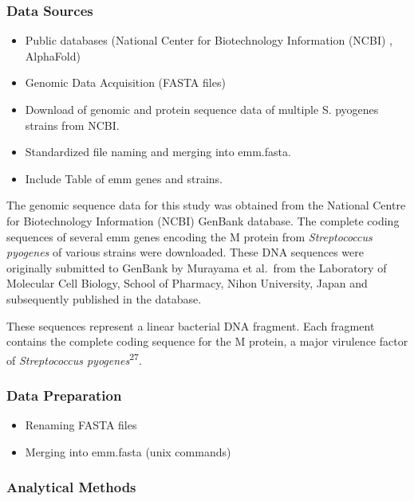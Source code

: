 \documentclass[
]{article}
\begin{document}
\subsubsection{Data Sources}\label{data-sources-1}

\begin{itemize}
\item
  Public databases (National Center for Biotechnology Information (NCBI)
  , AlphaFold)
\item
  Genomic Data Acquisition (FASTA files)
\item
  Download of genomic and protein sequence data of multiple S. pyogenes
  strains from NCBI.
\item
  Standardized file naming and merging into emm.fasta.
\item
  Include Table of emm genes and strains.
\end{itemize}

The genomic sequence data for this study was obtained from the National
Centre for Biotechnology Information (NCBI) GenBank database. The
complete coding sequences of several emm genes encoding the M protein
from \emph{Streptococcus pyogenes} of various strains were downloaded.
These DNA sequences were originally submitted to GenBank by Murayama et
al.~from the Laboratory of Molecular Cell Biology, School of Pharmacy,
Nihon University, Japan and subsequently published in the database.

These sequences represent a linear bacterial DNA fragment. Each fragment
contains the complete coding sequence for the M protein, a major
virulence factor of \emph{Streptococcus pyogenes}\textsuperscript{27}.

\subsubsection{Data Preparation}\label{data-preparation}

\begin{itemize}
\item
  Renaming FASTA files
\item
  Merging into emm.fasta (unix commands)
\end{itemize}

\subsubsection{Analytical Methods}\label{analytical-methods-1}
\end{document}
